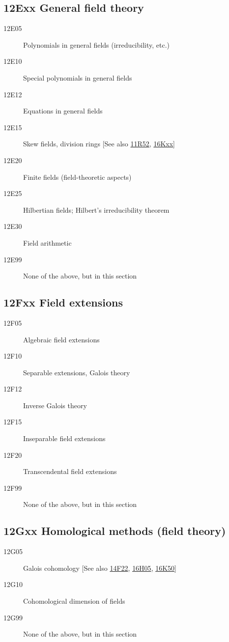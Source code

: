 \documentclass[letterpaper]{article}
\begin{document}
\subsection*{12Exx  General field theory }\label{12Exx}
\begin{description}  
\item [12E05]\label{12E05} Polynomials in general fields (irreducibility, etc.)
\item [12E10]\label{12E10} Special polynomials in general fields
\item [12E12]\label{12E12} Equations in general fields
\item [12E15]\label{12E15} Skew fields, division rings [See also \hyperref[11R52]{11R52}, \hyperref[16Kxx]{16Kxx}]
\item [12E20]\label{12E20} Finite fields (field-theoretic aspects)
\item [12E25]\label{12E25} Hilbertian fields; Hilbert's irreducibility theorem
\item [12E30]\label{12E30} Field arithmetic
\item [12E99]\label{12E99} None of the above, but in this section
\end{description}
\subsection*{12Fxx  Field extensions }\label{12Fxx}
\begin{description}  
\item [12F05]\label{12F05} Algebraic field extensions
\item [12F10]\label{12F10} Separable extensions, Galois theory
\item [12F12]\label{12F12} Inverse Galois theory
\item [12F15]\label{12F15} Inseparable field extensions
\item [12F20]\label{12F20} Transcendental field extensions 
\item [12F99]\label{12F99} None of the above, but in this section
\end{description}
\subsection*{12Gxx  Homological methods (field theory) }\label{12Gxx}
\begin{description}  
\item [12G05]\label{12G05} Galois cohomology [See also \hyperref[14F22]{14F22}, \hyperref[16H05]{16H05}, \hyperref[16K50]{16K50}]
\item [12G10]\label{12G10} Cohomological dimension of fields
\item [12G99]\label{12G99} None of the above, but in this section
\end{description}
\end{document}
